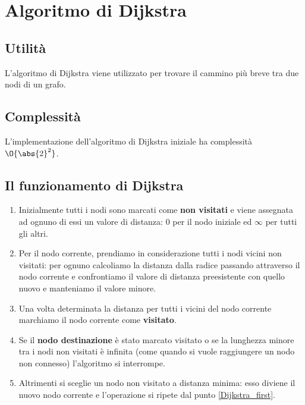 \documentclass[\main/main.tex]{subfiles}
\begin{document}
\chapter{Algoritmo di Dijkstra}
\section{Utilità}
L'algoritmo di Dijkstra viene utilizzato per trovare il cammino più breve tra due nodi di un grafo.
\section{Complessità}
\begin{complexity}
  L'implementazione dell'algoritmo di Dijkstra iniziale ha complessità \(\O{\abs{2}^2}\).
\end{complexity}

\section{Il funzionamento di Dijkstra}
\begin{enumerate}
  \item Inizialmente tutti i nodi sono marcati come \textbf{non visitati} e viene assegnata ad ognuno di essi un valore di distanza: \(0\) per il nodo iniziale ed \(\infty \) per tutti gli altri.
  \item Per il nodo corrente, prendiamo in considerazione tutti i nodi vicini non visitati: per ognuno calcoliamo la distanza dalla radice passando attraverso il nodo corrente e confrontiamo il valore di distanza preesistente con quello nuovo e manteniamo il valore minore.\label{Dijkstra_first}
  \item Una volta determinata la distanza per tutti i vicini del nodo corrente marchiamo il nodo corrente come \textbf{visitato}.
  \item Se il \textbf{nodo destinazione} è stato marcato visitato o se la lunghezza minore tra i nodi non visitati è infinita (come quando si vuole raggiungere un nodo non connesso) l'algoritmo si interrompe.
  \item Altrimenti si sceglie un nodo non visitato a distanza minima: esso diviene il nuovo nodo corrente e l'operazione si ripete dal punto \ref{Dijkstra_first}.
\end{enumerate}
\clearpage
\end{document}
